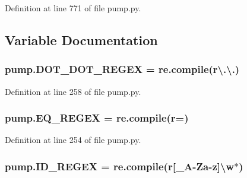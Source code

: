 Definition at line 771 of file pump.\+py.



\subsection{Variable Documentation}
\subsubsection[{\texorpdfstring{D\+O\+T\+\_\+\+D\+O\+T\+\_\+\+R\+E\+G\+EX}{DOT_DOT_REGEX}}]{\setlength{\rightskip}{0pt plus 5cm}pump.\+D\+O\+T\+\_\+\+D\+O\+T\+\_\+\+R\+E\+G\+EX = re.\+compile(r\textquotesingle{}\textbackslash{}.\textbackslash{}.\textquotesingle{})}\hypertarget{namespacepump_a45644ad738e584ec754f6d9f45fe693c}{}\label{namespacepump_a45644ad738e584ec754f6d9f45fe693c}


Definition at line 258 of file pump.\+py.

\subsubsection[{\texorpdfstring{E\+Q\+\_\+\+R\+E\+G\+EX}{EQ_REGEX}}]{\setlength{\rightskip}{0pt plus 5cm}pump.\+E\+Q\+\_\+\+R\+E\+G\+EX = re.\+compile(r\textquotesingle{}=\textquotesingle{})}\hypertarget{namespacepump_a6397ed9bab62b5c6f60a6626f6b287e0}{}\label{namespacepump_a6397ed9bab62b5c6f60a6626f6b287e0}


Definition at line 254 of file pump.\+py.

\subsubsection[{\texorpdfstring{I\+D\+\_\+\+R\+E\+G\+EX}{ID_REGEX}}]{\setlength{\rightskip}{0pt plus 5cm}pump.\+I\+D\+\_\+\+R\+E\+G\+EX = re.\+compile(r\textquotesingle{}\mbox{[}\+\_\+A-\/Za-\/z\mbox{]}\textbackslash{}w$\ast$\textquotesingle{})}\hypertarget{namespacepump_a8e008923b6c378b8d3df611fb07d6dda}{}\label{namespacepump_a8e008923b6c378b8d3df611fb07d6dda}


